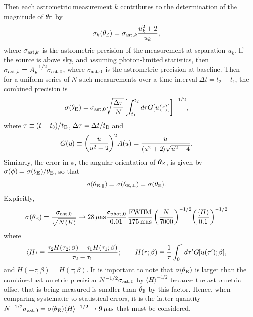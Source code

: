 \documentclass[12pt,preprint]{aastex}
\newcommand{\bdv}[1]{\mbox{\boldmath$#1$}}
\def\mas{{\rm mas}}
\def\fwhm{{\rm FWHM}}
\def\e{{\rm E}}
\def\btheta{{\bdv\theta}}
\def\muas{{\mu\rm as}}
\begin{document}
Then each astrometric measurement $k$ contributes to the determination of
the magnitude of $\theta_\e$ by
\begin{equation}
\sigma_k(\theta_\e) = \sigma_{{\rm ast},k}{u_k^2 + 2\over u_k},
\label{eqn:sigmak}
\end{equation}
where $\sigma_{{\rm ast},k}$ is the astrometric precision of the measurement
at separation $u_k$.
If the source is above sky, and assuming photon-limited statistics,
then $\sigma_{{\rm ast},k}=A_k^{-1/2}\sigma_{{\rm ast},0}$, where $\sigma_{{\rm ast},0}$ 
is the astrometric precision at baseline.  Then for a uniform series
of $N$ such measurements over a time interval $\Delta t=t_2-t_1$, the combined
precision is
\begin{equation}
\sigma(\theta_\e) = \sigma_{{\rm ast},0}\sqrt{\Delta \tau\over N}
\biggl[\int_{t_1}^{t_2} d\tau G[u(\tau)]\biggr]^{-1/2},
\label{eqn:sigmatot}
\end{equation}
where $\tau\equiv (t-t_0)/t_\e$, $\Delta\tau=\Delta t/t_\e$ and
\begin{equation}
G(u) \equiv \biggl({u\over u^2 + 2}\biggr)^2A(u)
= {u\over (u^2 + 2)\sqrt{u^2 + 4}}.
\label{eqn:gdef}
\end{equation}
Similarly, the error in $\phi$, the angular orientation of $\btheta_\e$, 
is given by $\sigma(\phi) = \sigma(\theta_\e)/\theta_\e$, so that
\begin{equation}
\sigma(\theta_{\e,\parallel}) = \sigma(\theta_{\e,\perp}) = \sigma(\theta_\e).
\label{eqn:sigmathetaepar}
\end{equation}
Explicitly,
\begin{equation}
\sigma(\theta_\e) = {\sigma_{{\rm ast},0}\over\sqrt{N\langle H \rangle}}
\rightarrow 28\,\muas
{\sigma_{{\rm phot},0}\over 0.01}\,
{\fwhm\over 175\,\mas}\,
\biggl({N \over 7000}\biggr)^{-1/2}
\biggl({\langle H \rangle \over 0.1}\biggr)^{-1/2}
\label{eqn:sigmatot2}
\end{equation}
where
\begin{equation}
\langle H \rangle \equiv 
{\tau_2 H(\tau_2;\beta) - \tau_1 H(\tau_1;\beta)\over \tau_2 - \tau_1};
\qquad
H(\tau;\beta) \equiv {1\over\tau}\int_0^\tau d\tau' G[u(\tau');\beta],
\label{eqn:hdef}
\end{equation}
and $H(-\tau;\beta) = H(\tau;\beta)$.  It is important to note that
$\sigma(\theta_\e)$ is larger than the combined astrometric precision
$N^{-1/2}\sigma_{\rm ast,0}$ by $\langle H \rangle^{-1/2}$
because the astrometric offset that is being measured is smaller than
$\theta_\e$ by this factor.  Hence, when comparing systematic to statistical
errors, it is the latter quantity 
$N^{-1/2}\sigma_{\rm ast,0}=\sigma(\theta_\e)\langle H \rangle^{-1/2}
\rightarrow 9\,\muas$ that
must be considered.
\end{document}
